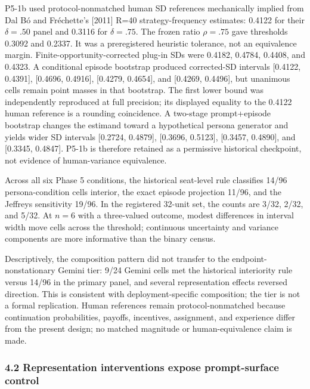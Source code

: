 \documentclass[
  11pt]{article}
\begin{document}
P5-1b used protocol-nonmatched human SD references mechanically implied
from Dal Bó and Fréchette's {[}2011{]} R=40 strategy-frequency
estimates: 0.4122 for their \(\delta=.50\) panel and 0.3116 for
\(\delta=.75\). The frozen ratio \(\rho=.75\) gave thresholds 0.3092 and
0.2337. It was a preregistered heuristic tolerance, not an equivalence
margin. Finite-opportunity-corrected plug-in SDs were 0.4182, 0.4784,
0.4408, and 0.4323. A conditional episode bootstrap produced
corrected-SD intervals {[}0.4122, 0.4391{]}, {[}0.4696, 0.4916{]},
{[}0.4279, 0.4654{]}, and {[}0.4269, 0.4496{]}, but unanimous cells
remain point masses in that bootstrap. The first lower bound was
independently reproduced at full precision; its displayed equality to
the 0.4122 human reference is a rounding coincidence. A two-stage
prompt+episode bootstrap changes the estimand toward a hypothetical
persona generator and yields wider SD intervals {[}0.2724, 0.4879{]},
{[}0.3696, 0.5123{]}, {[}0.3457, 0.4890{]}, and {[}0.3345, 0.4847{]}.
P5-1b is therefore retained as a permissive historical checkpoint, not
evidence of human-variance equivalence.

Across all six Phase 5 conditions, the historical seat-level rule
classifies 14/96 persona-condition cells interior, the exact episode
projection 11/96, and the Jeffreys sensitivity 19/96. In the registered
32-unit set, the counts are 3/32, 2/32, and 5/32. At \(n=6\) with a
three-valued outcome, modest differences in interval width move cells
across the threshold; continuous uncertainty and variance components are
more informative than the binary census.

Descriptively, the composition pattern did not transfer to the
endpoint-nonstationary Gemini tier: 9/24 Gemini cells met the historical
interiority rule versus 14/96 in the primary panel, and several
representation effects reversed direction. This is consistent with
deployment-specific composition; the tier is not a formal replication.
Human references remain protocol-nonmatched because continuation
probabilities, payoffs, incentives, assignment, and experience differ
from the present design; no matched magnitude or human-equivalence claim
is made.

\subsubsection{4.2 Representation interventions expose prompt-surface
control}\label{representation-interventions-expose-prompt-surface-control}
\end{document}
